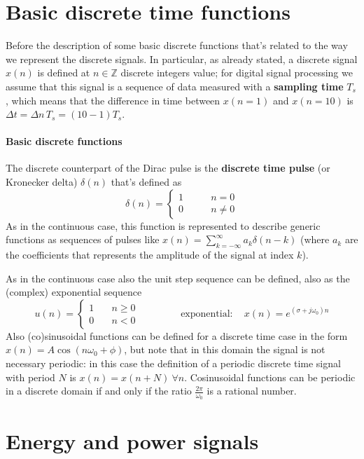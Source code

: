 \section*{Basic discrete time functions}
 	
 	Before the description of some basic discrete functions that's related to the way we represent the discrete signals. In particular, as already stated, a discrete signal $x(n)$ is defined at $n\in \mathds Z$ discrete integers value; for digital signal processing we assume that this signal is a sequence of data measured with a \textbf{sampling time} $T_s$, which means that the difference in time between $x(n=1)$ and $x(n=10)$ is $\Delta t = \Delta n\, T_s = (10-1)T_s$.
 	
 	\paragraph{Basic discrete functions} The discrete counterpart of the Dirac pulse is the \textbf{discrete time pulse} (or Kronecker delta) $\delta(n)$ that's defined as
 	\[ \delta(n) = \begin{cases}
 		1\qquad & n = 0 \\ 0 & n\neq 0
 	\end{cases} \] 
 	As in the continuous case, this function is represented to describe generic functions as sequences of pulses like $x(n) = \sum_{k=-\infty}^\infty a_k \delta(n-k)$ (where $a_k$ are the coefficients that represents the amplitude of the signal at index $k$).
 	
 	As in the continuous case also the unit step sequence can be defined, also as the (complex) exponential sequence
 	\[ u(n) = \begin{cases}
 		1 \quad & n \geq 0 \\ 0 & n <0
 	\end{cases} \qquad \ \qquad \textrm{exponential}: \quad x(n) = e^{(\sigma + j \omega_0)n} \]
 	Also (co)sinusoidal functions can be defined for a discrete time case in the form $x(n) = A \cos(n\omega_0 + \phi)$, but note that in this domain the signal is not necessary periodic: in this case the definition of a periodic discrete time signal with period $N$ is $x(n) = x(n+N) \ \forall n$. Cosinusoidal functions can be periodic in a discrete domain if and only if the ratio $\frac{2\pi}{\omega_0}$ is a rational number.
 	
\section*{Energy and power signals}
	
